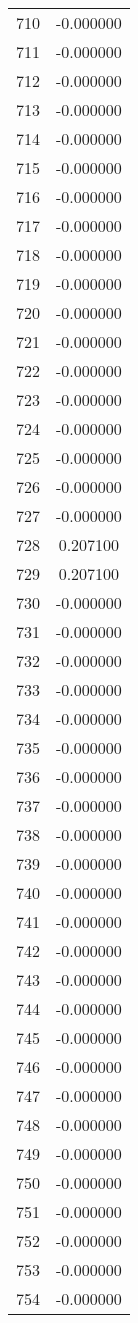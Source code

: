 \documentclass[12pt]{article}
\begin{document}
\begin{longtable}{@{}cc@{}}
710 & -0.000000 \\
711 & -0.000000 \\
712 & -0.000000 \\
713 & -0.000000 \\
714 & -0.000000 \\
715 & -0.000000 \\
716 & -0.000000 \\
717 & -0.000000 \\
718 & -0.000000 \\
719 & -0.000000 \\
720 & -0.000000 \\
721 & -0.000000 \\
722 & -0.000000 \\
723 & -0.000000 \\
724 & -0.000000 \\
725 & -0.000000 \\
726 & -0.000000 \\
727 & -0.000000 \\
728 & 0.207100 \\
729 & 0.207100 \\
730 & -0.000000 \\
731 & -0.000000 \\
732 & -0.000000 \\
733 & -0.000000 \\
734 & -0.000000 \\
735 & -0.000000 \\
736 & -0.000000 \\
737 & -0.000000 \\
738 & -0.000000 \\
739 & -0.000000 \\
740 & -0.000000 \\
741 & -0.000000 \\
742 & -0.000000 \\
743 & -0.000000 \\
744 & -0.000000 \\
745 & -0.000000 \\
746 & -0.000000 \\
747 & -0.000000 \\
748 & -0.000000 \\
749 & -0.000000 \\
750 & -0.000000 \\
751 & -0.000000 \\
752 & -0.000000 \\
753 & -0.000000 \\
754 & -0.000000 \\

\end{longtable}
\end{document}

